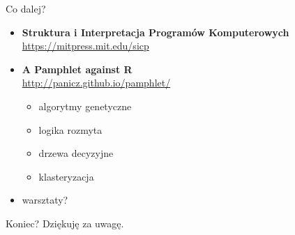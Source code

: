 \documentclass{beamer}
\begin{document}
\begin{frame}
  Co dalej? \pause
  \begin{itemize}
  \item \textbf{Struktura i Interpretacja Programów Komputerowych} \\
    \url{https://mitpress.mit.edu/sicp} \pause
  \item \textbf{A Pamphlet against R}\\
    \url{http://panicz.github.io/pamphlet/} \pause
    \begin{itemize}
    \item algorytmy genetyczne \pause
    \item logika rozmyta \pause
    \item drzewa decyzyjne \pause
    \item klasteryzacja \pause
    \end{itemize}
    \item warsztaty?
  \end{itemize}
\end{frame}

\begin{frame}{Koniec?}
  Dziękuję za uwagę.
\end{frame}
\end{document}
